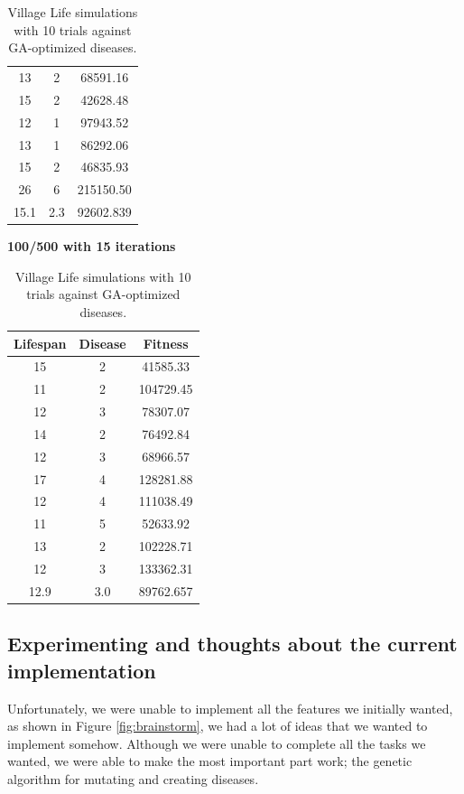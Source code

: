 \documentclass[conference,compsoc]{IEEEtran}
\begin{document}
\begin{table}[!t]
\begin{center}
\begin{minipage}{0.25\textwidth}
\begin{tabular}{|c|c|c|}
	13 & 2 &  68591.16\\
	15 & 2 &  42628.48\\
	12 & 1 &  97943.52\\
	13 & 1 &  86292.06\\
	15 & 2 &  46835.93\\
	26 & 6 & 215150.50\\ %
	\hline
	15.1 & 2.3 & 92602.839\\
	\hline
	\end{tabular}
\end{minipage}%
\begin{minipage}{0.25\textwidth}
\centering
\textbf{100/500 with 15 iterations}\\
	\begin{tabular}{|c|c|c|}
	\hline
	Lifespan & Disease & Fitness\\
	\hline
	15 & 2 &  41585.33\\
	11 & 2 & 104729.45\\
	12 & 3 &  78307.07\\
	14 & 2 &  76492.84\\
	12 & 3 &  68966.57\\
	17 & 4 & 128281.88\\
	12 & 4 & 111038.49\\
	11 & 5 &  52633.92\\
	13 & 2 & 102228.71\\
	12 & 3 & 133362.31\\
	\hline
	12.9 & 3.0 & 89762.657\\
	\hline
	\end{tabular}
\end{minipage}%
\end{center}
\caption{Village Life simulations with 10 trials against GA-optimized diseases.}
\label{fig:DefaultExperiment}
\end{table}

\subsection{Experimenting and thoughts about the current implementation}
Unfortunately, we were unable to implement all the features we initially wanted, as shown in Figure \ref{fig:brainstorm}, we had a lot of ideas that we wanted to implement somehow. Although we were unable to complete all the tasks we wanted, we were able to make the most important part work; the genetic algorithm for mutating and creating diseases.\\
\end{document}
